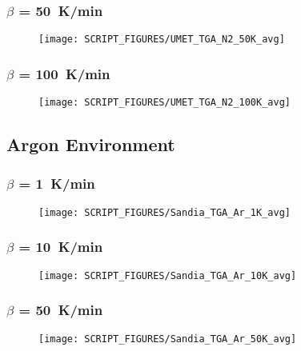 \newpage
\subsubsection{$\beta$ = 50~K/min}
\begin{minipage}{0.5\textwidth}
\begin{figure}[H]
{\texttt{[image: SCRIPT\_FIGURES/UMET\_TGA\_N2\_50K\_avg]}}\\
\end{figure}
\end{minipage} 


\subsubsection{$\beta$ = 100~K/min}
\begin{minipage}{0.5\textwidth}
\begin{figure}[H]
{\texttt{[image: SCRIPT\_FIGURES/UMET\_TGA\_N2\_100K\_avg]}}\\
\end{figure}
\end{minipage} 
\vfill

\subsection{Argon Environment}
\label{TGA_Ar}
\subsubsection{$\beta$ = 1~K/min}
\begin{minipage}{0.5\textwidth}
\begin{figure}[H]
{\texttt{[image: SCRIPT\_FIGURES/Sandia\_TGA\_Ar\_1K\_avg]}}\\
\end{figure}
\end{minipage} 

\subsubsection{$\beta$ = 10~K/min}
\begin{minipage}{0.5\textwidth}
\begin{figure}[H]
{\texttt{[image: SCRIPT\_FIGURES/Sandia\_TGA\_Ar\_10K\_avg]}}\\
\end{figure}
\end{minipage} 
\vfill 

\subsubsection{$\beta$ = 50~K/min}
\begin{minipage}{0.5\textwidth}
\begin{figure}[H]
{\texttt{[image: SCRIPT\_FIGURES/Sandia\_TGA\_Ar\_50K\_avg]}}\\
\end{figure}
\end{minipage} 
\vfill

